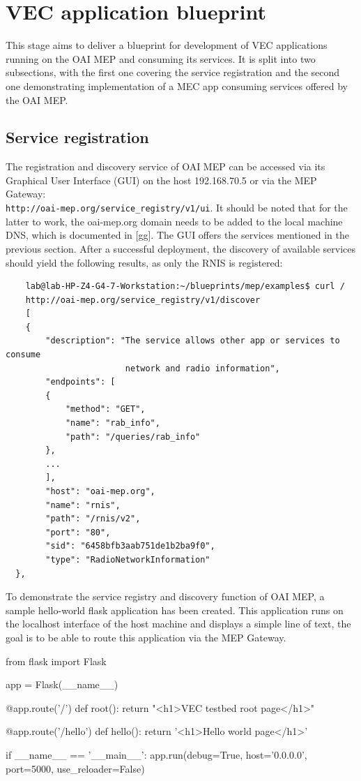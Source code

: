 \documentclass[12pt,a4paper,twoside]{report}
\begin{document}
\section{VEC application blueprint}
This stage aims to deliver a blueprint for development of VEC applications running on the OAI MEP and consuming its services. It is split into two subsections, with the first one covering the service registration and the second one demonstrating implementation of a MEC app consuming services offered by the OAI MEP.
\subsection{Service registration}
The registration and discovery service of OAI MEP can be accessed via its Graphical User Interface (GUI) on the host 192.168.70.5 or via the MEP Gateway: \\ \verb |http://oai-mep.org/service_registry/v1/ui|. It should be noted that for the latter to work, the oai-mep.org domain needs to be added to the local machine DNS, which is documented in [gg]. The GUI offers the services mentioned in the previous section. After a successful deployment, the discovery of available services should yield the following results, as only the RNIS is registered:
\begin{verbatim}
	lab@lab-HP-Z4-G4-7-Workstation:~/blueprints/mep/examples$ curl /
	http://oai-mep.org/service_registry/v1/discover 
	[
	{
		"description": "The service allows other app or services to consume
						network and radio information",
		"endpoints": [
		{
			"method": "GET",
			"name": "rab_info",
			"path": "/queries/rab_info"
		},
		...
		],
		"host": "oai-mep.org",
		"name": "rnis",
		"path": "/rnis/v2",
		"port": "80",
		"sid": "6458bfb3aab751de1b2ba9f0",
		"type": "RadioNetworkInformation"
  },

\end{verbatim}
To demonstrate the service registry and discovery function of OAI MEP, a sample hello-world flask application has been created. This application runs on the localhost interface of the host machine and displays a simple line of text, the goal is to be able to route this application via the MEP Gateway.
\begin{flask}[caption={Sample flask app in python}]
	from flask import Flask

	app = Flask(__name__)

	@app.route('/')
	def root():
		return "<h1>VEC testbed root page</h1>"

	@app.route('/hello')
	def hello():
		return '<h1>Hello world page</h1>'

	if __name__ == '__main__':
		app.run(debug=True, host='0.0.0.0', port=5000, use_reloader=False)
\end{flask}
\end{document}
